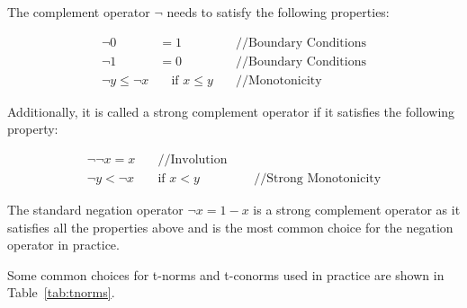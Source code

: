 
The complement operator $\neg$ needs to satisfy the following properties:

\begin{align*}
      \neg 0             & = 1                       & \quad \text{//Boundary Conditions} \\
      \neg 1             & = 0                       & \quad \text{//Boundary Conditions} \\
      \neg y \leq \neg x & \quad \text{if } x \leq y & \quad \text{//Monotonicity}
\end{align*}

Additionally, it is called a strong complement operator if it satisfies the following property:

\begin{align}
      \neg \neg x = x & \quad \text{//Involution}                                       \\
      \neg y < \neg x & \quad \text{if } x < y    & \quad \text{ //Strong Monotonicity}
\end{align}


The standard negation operator $\neg x = 1 - x$ is a strong complement operator as it satisfies all the properties above and is the most common choice for the negation operator in practice.

Some common choices for t-norms and t-conorms used in practice are shown in Table~\ref{tab:tnorms}.

